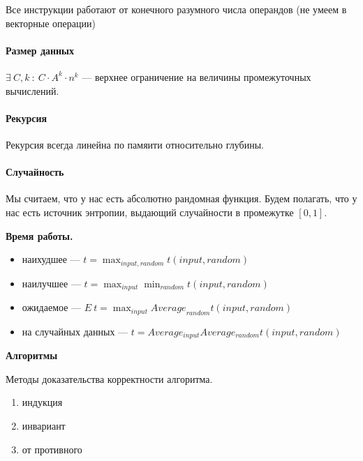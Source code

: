 \documentclass{article}
\begin{document}
Все инструкции работают от конечного разумного числа операндов (не умеем в векторные операции)

\paragraph{Размер данных}

$\exists~C, k~:~ C \cdot A^k \cdot n^k$ --- верхнее ограничение на величины промежуточных вычислений.

\paragraph{Рекурсия}

Рекурсия всегда линейна по памяити относительно глубины.

\paragraph{Случайность}

Мы считаем, что у нас есть абсолютно рандомная функция. Будем полагать, что у нас есть источник энтропии, выдающий случайности в промежутке $[0, 1]$.

\textbf{Время работы.} \begin{itemize}
\item наихудшее --- $t = \displaystyle\max_{input, random} t(input, random)$
\item наилучшее --- $t = \displaystyle\max_{input} \displaystyle\min_{random} t(input, random)$
\item ожидаемое --- $E\ t = \displaystyle\max_{input} {Average}_{random} t(input, random)$
\item на случайных данных --- $t = Average_{input} Average_{random} t(input, random)$
\end{itemize}


\textbf{Алгоритмы}

Методы доказательства корректности алгоритма.
\begin{enumerate}
    \item индукция
    \item инвариант
    \item от противного
\end{enumerate}
\end{document}
